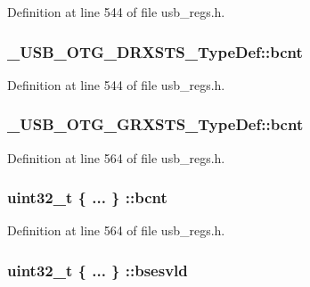 Definition at line 544 of file usb\-\_\-regs.\-h.

\hypertarget{group___u_s_b___o_t_g___d_r_i_v_e_r_ga5d9116a3a8b6fbe994ca0fef4ea1fc07}{
\subsubsection[{bcnt}]{ \-\_\-\-U\-S\-B\-\_\-\-O\-T\-G\-\_\-\-D\-R\-X\-S\-T\-S\-\_\-\-Type\-Def\-::bcnt}}\label{group___u_s_b___o_t_g___d_r_i_v_e_r_ga5d9116a3a8b6fbe994ca0fef4ea1fc07}


Definition at line 544 of file usb\-\_\-regs.\-h.

\hypertarget{group___u_s_b___o_t_g___d_r_i_v_e_r_gaf3069e9e6cdea3892dc19c9b53f539a6}{
\subsubsection[{bcnt}]{ \-\_\-\-U\-S\-B\-\_\-\-O\-T\-G\-\_\-\-G\-R\-X\-S\-T\-S\-\_\-\-Type\-Def\-::bcnt}}\label{group___u_s_b___o_t_g___d_r_i_v_e_r_gaf3069e9e6cdea3892dc19c9b53f539a6}


Definition at line 564 of file usb\-\_\-regs.\-h.

\hypertarget{group___u_s_b___o_t_g___d_r_i_v_e_r_ga9821b397524a14cd3efa527de2263725}{
\subsubsection[{bcnt}]{\setlength{\rightskip}{0pt plus 5cm}uint32\-\_\-t \{ ... \} \-::bcnt}}\label{group___u_s_b___o_t_g___d_r_i_v_e_r_ga9821b397524a14cd3efa527de2263725}


Definition at line 564 of file usb\-\_\-regs.\-h.

\hypertarget{group___u_s_b___o_t_g___d_r_i_v_e_r_ga24a8fdf1c5804ad2940791d348cc00da}{
\subsubsection[{bsesvld}]{\setlength{\rightskip}{0pt plus 5cm}uint32\-\_\-t \{ ... \} \-::bsesvld}}\label{group___u_s_b___o_t_g___d_r_i_v_e_r_ga24a8fdf1c5804ad2940791d348cc00da}


